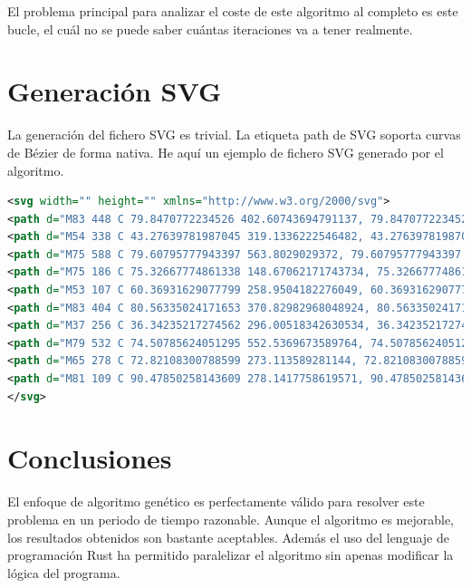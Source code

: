 \documentclass{report}
\begin{document}
El problema principal para analizar el coste de este algoritmo al completo es este bucle, el cuál no se puede saber cuántas iteraciones va a tener realmente. 

\chapter{Generación SVG}

La generación del fichero SVG es trivial. La etiqueta path de SVG soporta curvas de Bézier de forma nativa. He aquí un ejemplo de fichero SVG generado por el algoritmo.

\begin{lstlisting}[language=XML]
<svg width="" height="" xmlns="http://www.w3.org/2000/svg">
<path d="M83 448 C 79.8470772234526 402.60743694791137, 79.8470772234526 402.60743694791137, 83 404" style="stroke: black;fill:none"/>
<path d="M54 338 C 43.27639781987045 319.1336222546482, 43.27639781987045 319.1336222546482, 37 256" style="stroke: black;fill:none"/>
<path d="M75 588 C 79.60795777943397 563.8029029372, 79.60795777943397 563.8029029372, 79 532" style="stroke: black;fill:none"/>
<path d="M75 186 C 75.32667774861338 148.67062171743734, 75.32667774861338 148.67062171743734, 81 109" style="stroke: black;fill:none"/>
<path d="M53 107 C 60.36931629077799 258.9504182276049, 60.36931629077799 258.9504182276049, 65 278" style="stroke: black;fill:none"/>
<path d="M83 404 C 80.56335024171653 370.82982968048924, 80.56335024171653 370.82982968048924, 54 338" style="stroke: black;fill:none"/>
<path d="M37 256 C 36.34235217274562 296.00518342630534, 36.34235217274562 296.00518342630534, 53 107" style="stroke: black;fill:none"/>
<path d="M79 532 C 74.50785624051295 552.5369673589764, 74.50785624051295 552.5369673589764, 83 448" style="stroke: black;fill:none"/>
<path d="M65 278 C 72.82108300788599 273.113589281144, 72.82108300788599 273.113589281144, 75 186" style="stroke: black;fill:none"/>
<path d="M81 109 C 90.47850258143609 278.1417758619571, 90.47850258143609 278.1417758619571, 93 279" style="stroke: black;fill:none"/>
</svg>
\end{lstlisting}

\chapter{Conclusiones}

El enfoque de algoritmo genético es perfectamente válido para resolver este problema en un periodo de tiempo razonable. Aunque el algoritmo
es mejorable, los resultados obtenidos son bastante aceptables. Además el uso del lenguaje de programación Rust ha permitido paralelizar el algoritmo sin apenas modificar la lógica del programa.
\end{document}
